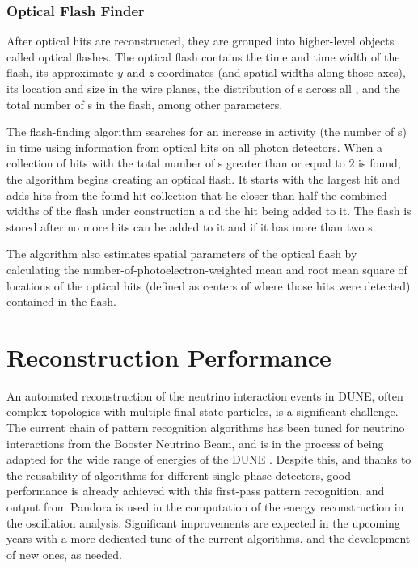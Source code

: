 \subsubsection{Optical Flash Finder}
After optical hits are reconstructed, they are grouped into higher-level objects called optical flashes.
The optical flash contains the time and time width of the flash,
its approximate $y$ and $z$ coordinates (and spatial widths along those axes),
its location and size in the wire planes,
the distribution of \phel{}s across all ,
and the total number of \phel{}s in the flash, among other parameters.

The flash-finding algorithm searches for an increase in  activity
(the number of \phel{}s) in time using information from optical hits
on all photon detectors.
When a collection of hits with the total number of \phel{}s  
greater than or equal to $2$ is found, the algorithm begins creating an optical flash.
It starts with the largest hit and adds hits from the found hit collection 
that lie closer than half the combined widths of the flash under construction
a nd the hit being added to it.
The flash is stored after no more hits can be added to it
and if it has more than two \phel{}s.

The algorithm also estimates spatial parameters of the optical flash
by calculating the number-of-photoelectron-weighted mean and 
root mean square of locations of the optical hits
(defined as centers of  where those hits were detected)
contained in the flash.

\section{Reconstruction Performance}
\label{sec:performance}

An automated reconstruction of the neutrino interaction events in DUNE, often complex topologies with multiple final state particles, is a significant challenge. The current chain of  pattern recognition algorithms %
has been tuned for neutrino interactions from the \fnal Booster Neutrino Beam, and is in the process of being adapted for the wide range of energies of the DUNE . Despite this, and thanks to the reusability of  algorithms for different single phase \lartpc detectors,  good performance is already achieved with this first-pass pattern recognition, and output from Pandora is used in the computation of the energy reconstruction in the oscillation analysis. Significant improvements are expected  in the upcoming years with a more dedicated tune of the current algorithms, and the development of new ones, as needed. %

